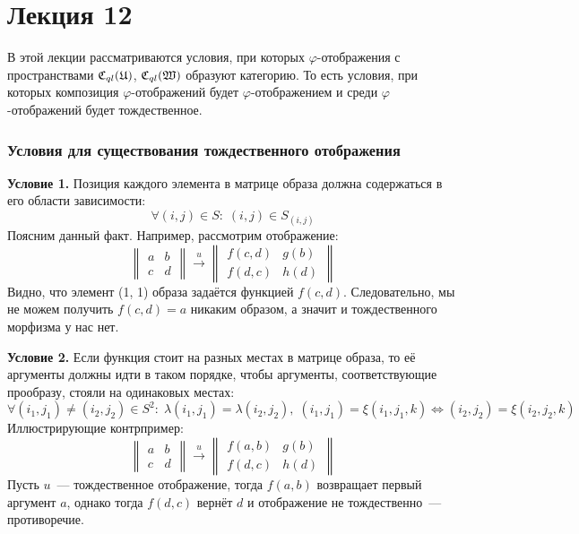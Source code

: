 \documentclass[a4paper, 12pt]{report}
\begin{document}
\chapter{Лекция 12}

В этой лекции рассматриваются условия, при которых $\varphi$-отображения с пространствами $\mathfrak{C}_{ql}(\mathfrak{U})$, $\mathfrak{C}_{ql}(\mathfrak{W})$ образуют категорию. То есть условия, при которых композиция $\varphi$-отображений будет $\varphi$-отображением и среди $\varphi$-отображений будет тождественное.

\subsection{Условия для существования тождественного отображения}

\textbf{Условие 1.} Позиция каждого элемента в матрице образа должна содержаться в его области зависимости:
\[
\forall (i, j) \in S: \; (i, j) \in S_{(i,j)}
\]
Поясним данный факт. Например, рассмотрим отображение:
\[
\begin{Vmatrix}
a & b\\
c & d
\end{Vmatrix}
\mathop{\rightarrow}\limits^u
\begin{Vmatrix}
f(c,d) & g(b)\\
f(d,c) & h(d)
\end{Vmatrix}
\]
Видно, что элемент (1, 1) образа задаётся функцией $f(c, d)$. Следовательно, мы не можем получить $f(c, d) = a$ никаким образом, а значит и тождественного морфизма у нас нет.

\textbf{Условие 2.} Если функция стоит на разных местах в матрице образа, то её аргументы должны идти в таком порядке, чтобы аргументы, соответствующие прообразу, стояли на одинаковых местах:
\[
\forall (i_1, j_1) \neq (i_2, j_2) \in S^2: \; \lambda(i_1, j_1) = \lambda(i_2, j_2), \; (i_1, j_1) = \xi(i_1, j_1, k) \Leftrightarrow (i_2, j_2) = \xi(i_2, j_2, k)
\]
Иллюстрирующие контрпример:\\
\[
\begin{Vmatrix}
a & b\\
c & d
\end{Vmatrix}
\mathop{\rightarrow}\limits^u
\begin{Vmatrix}
f(a,b) & g(b)\\
f(d,c) & h(d)
\end{Vmatrix}
\]
Пусть $u$~--- тождественное отображение, тогда $f(a,b)$ возвращает первый аргумент $a$, однако тогда $f(d,c)$ вернёт $d$ и отображение не тождественно~--- противоречие.
\end{document}
